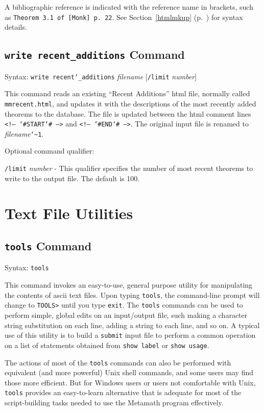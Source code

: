 A bibliographic reference is indicated with the reference name
in brackets, such as  \texttt{Theorem 3.1 of
[Monk] p.\ 22}.
See Section~\ref{htmlmkup} (p.~\pageref{htmlmkup}) for
syntax details.


\subsection{\texttt{write recent\_additions}
Command}
Syntax:  \texttt{write recent{\char`\_}additions} {\em filename}
[\texttt{/limit} {\em number}]

This command reads an existing ``Recent Additions'' {\sc html} file,
normally called \texttt{mmrecent.html}, and updates it with the
descriptions of the most recently added theorems to the database.
 The file is updated between
the {\sc html} comment lines \texttt{<!-- {\char`\#}START{\char`\#} -->}
and \texttt{<!-- {\char`\#}END{\char`\#} -->}.  The original input file
is renamed to {\em filename}\texttt{{\char`\~}1}.

Optional command qualifier:

    \texttt{/limit} {\em number} -
 This qualifier specifies the number of most recent theorems to
   write to the output file.  The default is 100.


\section{Text File Utilities}

\subsection{\texttt{tools} Command}
Syntax:  \texttt{tools}

This command invokes an easy-to-use, general purpose utility for
manipulating the contents of {\sc ascii} text files.  Upon typing
\texttt{tools}, the command-line prompt will change to \texttt{TOOLS>}
until you type \texttt{exit}.  The \texttt{tools} commands can be used
to perform simple, global edits on an input/output file,
such making a character string substitution on each line, adding a
string to each line, and so on.  A typical use of this utility is
to build a \texttt{submit} input file to perform a common operation on a
list of statements obtained from \texttt{show label} or \texttt{show
usage}.

The actions of most of the \texttt{tools} commands can also be
performed with equivalent (and more powerful) Unix shell commands, and
some users may find those more efficient.  But for Windows users or
users not comfortable with Unix, \texttt{tools} provides an
easy-to-learn alternative that is adequate for most of the
script-building tasks needed to use the Metamath program effectively.


